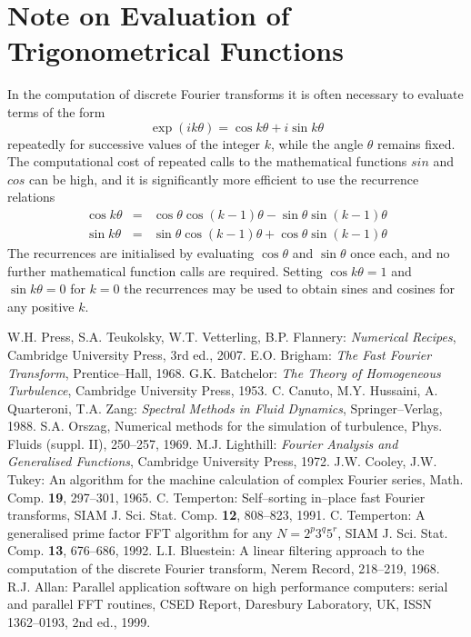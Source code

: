 \documentclass[dvips]{article}
\begin{document}
\section*{Note on Evaluation of Trigonometrical Functions}
In the computation of discrete Fourier transforms it is often necessary to
evaluate terms of the form
\[
\exp{(ik\theta)} = \cos{k\theta} + i\sin{k\theta}
\]
repeatedly for successive values of the integer $k$, while the angle
$\theta$ remains fixed.  The
computational cost of repeated calls to the mathematical functions
$sin$ and $cos$ can be high, and it is significantly more
efficient to use the recurrence relations
\begin{eqnarray}
\cos{k\theta} & = & \cos{\theta}\cos{(k-1)\theta}
                    - \sin{\theta}\sin{(k-1)\theta} \nonumber \\
\sin{k\theta} & = & \sin{\theta}\cos{(k-1)\theta}
                    + \cos{\theta}\sin{(k-1)\theta} \nonumber 
\end{eqnarray}
The recurrences are initialised by evaluating $\cos{\theta}$ and
$\sin{\theta}$ once each, and no further mathematical function calls
are required.  Setting $\cos{k\theta}=1$ and $\sin{k\theta}=0$ for $k=0$
the recurrences may be used to obtain sines and cosines for any positive $k$.

\newpage
\begin{thebibliography}{99}
W.H. Press, S.A. Teukolsky, W.T. Vetterling, B.P. Flannery:
{\it Numerical Recipes}, Cambridge University Press, 3rd ed., 2007.
E.O. Brigham: {\it The Fast Fourier Transform},
Prentice--Hall, 1968.
 G.K. Batchelor: {\it The Theory of Homogeneous
Turbulence}, Cambridge University Press, 1953.
C. Canuto, M.Y. Hussaini, A. Quarteroni, T.A. Zang: {\it
Spectral Methods in Fluid Dynamics}, Springer--Verlag, 1988.
S.A. Orszag, Numerical methods for the simulation of
turbulence, Phys. Fluids (suppl. II), 250--257, 1969.
M.J. Lighthill: {\it Fourier Analysis and Generalised
Functions}, Cambridge University Press, 1972.
J.W. Cooley, J.W. Tukey: An algorithm for the
machine calculation of complex Fourier series, Math. Comp. {\bf 19},
297--301, 1965.
C. Temperton: Self--sorting in--place fast Fourier
transforms, SIAM J. Sci. Stat. Comp. {\bf 12}, 808--823, 1991.
C. Temperton: A generalised prime factor FFT algorithm
for any $N=2^{p}3^{q}5^{r}$, SIAM J. Sci. Stat. Comp. {\bf 13},
676--686, 1992.
L.I. Bluestein: A linear filtering approach to the
computation of the discrete Fourier transform, Nerem Record, 218--219, 1968.
R.J. Allan: Parallel application software on high
performance computers: serial and parallel FFT routines, CSED Report,
Daresbury Laboratory, UK, ISSN 1362--0193, 2nd ed., 1999.
\end{thebibliography}
\end{document}
